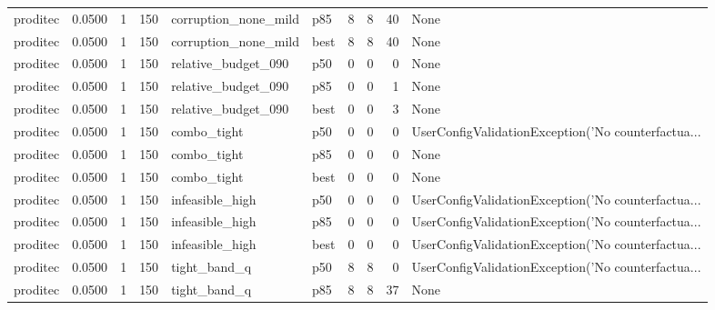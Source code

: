 \begin{tabular}{lrrrllrrrl}
proditec &    0.0500 &    1 &    150 & corruption\_none\_mild &    p85 &               8 &          8 &      40 &                                               None \\
proditec &    0.0500 &    1 &    150 & corruption\_none\_mild &   best &               8 &          8 &      40 &                                               None \\
proditec &    0.0500 &    1 &    150 &  relative\_budget\_090 &    p50 &               0 &          0 &       0 &                                               None \\
proditec &    0.0500 &    1 &    150 &  relative\_budget\_090 &    p85 &               0 &          0 &       1 &                                               None \\
proditec &    0.0500 &    1 &    150 &  relative\_budget\_090 &   best &               0 &          0 &       3 &                                               None \\
proditec &    0.0500 &    1 &    150 &          combo\_tight &    p50 &               0 &          0 &       0 & UserConfigValidationException('No counterfactua... \\
proditec &    0.0500 &    1 &    150 &          combo\_tight &    p85 &               0 &          0 &       0 &                                               None \\
proditec &    0.0500 &    1 &    150 &          combo\_tight &   best &               0 &          0 &       0 &                                               None \\
proditec &    0.0500 &    1 &    150 &      infeasible\_high &    p50 &               0 &          0 &       0 & UserConfigValidationException('No counterfactua... \\
proditec &    0.0500 &    1 &    150 &      infeasible\_high &    p85 &               0 &          0 &       0 & UserConfigValidationException('No counterfactua... \\
proditec &    0.0500 &    1 &    150 &      infeasible\_high &   best &               0 &          0 &       0 & UserConfigValidationException('No counterfactua... \\
proditec &    0.0500 &    1 &    150 &         tight\_band\_q &    p50 &               8 &          8 &       0 & UserConfigValidationException('No counterfactua... \\
proditec &    0.0500 &    1 &    150 &         tight\_band\_q &    p85 &               8 &          8 &      37 &                                               None \\

\end{tabular}
